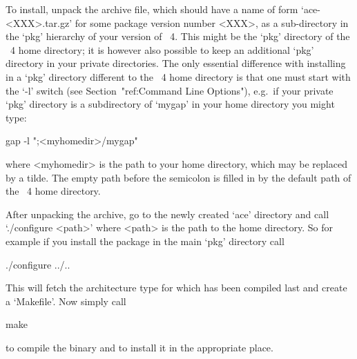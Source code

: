 


To install, unpack the archive file, which should have a name of  form
`ace-<XXX>.tar.gz'  for  some  package  version  number   <XXX>, as  a
sub-directory in the `pkg' hierarchy of your version of {\GAP}~4. This
might be the `pkg' directory of the {\GAP}~4  home  directory;  it  is
however also possible to keep an additional `pkg'  directory  in  your
private directories. The only  essential  difference  with  installing
{\ACE} in a `pkg' directory different to the {\GAP}~4  home  directory
is  that  one  must  start  {\GAP}   with   the   `-l'   switch   (see
Section~"ref:Command  Line  Options"),  e.g.~if  your  private   `pkg'
directory is a subdirectory of `mygap'  in  your  home  directory  you
might type:

gap -l ";<myhomedir>/mygap"

where <myhomedir> is the  path to your  home  directory,  which may be
replaced by a tilde.  The empty path before the semicolon is filled in
by the default path of the {\GAP}~4 home directory.

After unpacking the archive, go to the newly created  `ace'  directory
and call `./configure <path>' where <path> is the path to  the  {\GAP}
home directory. So for example if you install the package in the  main
`pkg' directory call

\begintt
./configure ../..
\endtt

This  will fetch  the  architecture  type for  which  {\GAP} has  been
compiled last and create a `Makefile'. Now simply call

\begintt
make
\endtt

to compile the binary and to install it in the appropriate place.

